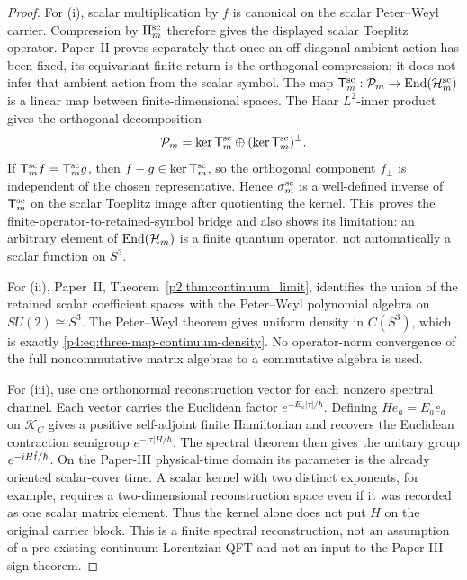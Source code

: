 \documentclass[12pt,a4paper]{article}
\begin{document}
\begin{proof}
For (i), scalar multiplication by \(f\) is canonical on the scalar
Peter--Weyl carrier.  Compression by \(\Pi_m^{\rm sc}\) therefore gives the
displayed scalar Toeplitz operator.  Paper~II proves separately that once an
off-diagonal ambient action has been fixed, its equivariant finite return is
the orthogonal compression; it does not infer that ambient action from the
scalar symbol.  The map
\(\mathsf T_m^{\rm sc}:\mathcal P_m\to\operatorname{End}(\mathcal H_m^{\rm sc})\) is a
linear map between finite-dimensional spaces.
The Haar \(L^2\)-inner product gives the orthogonal decomposition
\[
\mathcal P_m=\ker\mathsf T_m^{\rm sc}
\oplus(\ker\mathsf T_m^{\rm sc})^\perp .
\]
If \(\mathsf T_m^{\rm sc}f=\mathsf T_m^{\rm sc}g\), then
\(f-g\in\ker\mathsf T_m^{\rm sc}\), so the orthogonal component
\(f_\perp\) is independent of the chosen representative.  Hence
\(\sigma_m^{\rm sc}\) is a well-defined inverse of
\(\mathsf T_m^{\rm sc}\) on the scalar Toeplitz image after quotienting the
kernel.
This proves the finite-operator-to-retained-symbol bridge and also shows its limitation: an arbitrary element of \(\operatorname{End}(\mathcal H_m)\) is a finite quantum operator, not automatically a scalar function on \(S^3\).

For (ii), Paper~II, Theorem~\ref{p2:thm:continuum_limit}, identifies the union of the retained scalar coefficient spaces with the Peter--Weyl polynomial algebra on \(SU(2)\cong S^3\).
The Peter--Weyl theorem gives uniform density in \(C(S^3)\), which is exactly \eqref{p4:eq:three-map-continuum-density}.
No operator-norm convergence of the full noncommutative matrix algebras to a commutative algebra is used.

For (iii), use one orthonormal reconstruction vector for each nonzero
spectral channel.  Each vector carries the Euclidean factor
\(e^{-E_a|\tau|/\hbar}\).  Defining \(H e_a=E_a e_a\) on
\(\mathcal K_C\) gives a positive self-adjoint finite Hamiltonian
and recovers the Euclidean contraction semigroup
\(e^{-|\tau|H/\hbar}\).
The spectral theorem then gives the unitary group
\(e^{-iH\tilde t/\hbar}\).  On the Paper-III physical-time domain its
parameter is the already oriented scalar-cover time.  A scalar kernel with
two distinct exponents, for example, requires a two-dimensional
reconstruction space even if it was recorded as one scalar matrix element.
Thus the kernel alone does not put \(H\) on the original carrier block.
This is a finite spectral reconstruction, not an assumption of a
pre-existing continuum Lorentzian QFT and not an input to the Paper-III sign
theorem.
\end{proof}
\end{document}
